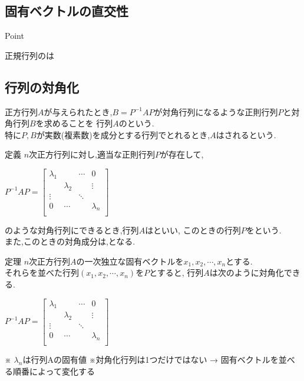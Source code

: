 \documentclass[a4paper]{jsarticle}
\begin{document}
\subsection{固有ベクトルの直交性}
\begin{itembox}[l]{Point}
    \begin{center}
        正規行列のは\\
    \end{center}
\end{itembox}

\subsection{行列の対角化}
正方行列$A$が与えられたとき,$B=P^{-1}AP$が対角行列になるような正則行列$P$と対角行列$B$を求めることを
行列$A$のという.\\
特に$P,B$が実数(複素数)を成分とする行列でとれるとき,$A$はされるという.
\begin{itembox}[l]{定義}
    $n$次正方行列に対し,適当な正則行列$P$が存在して,\\
    \begin{center}
        $P^{-1}AP=
            \begin{bmatrix}
                \lambda_1 &           & \cdots & 0         \\
                          & \lambda_2 &        & \vdots    \\
                \vdots    &           & \ddots &           \\
                0         & \cdots    &        & \lambda_n \\
            \end{bmatrix}
        $
    \end{center}
    のような対角行列にできるとき,行列$A$はといい,
    このときの行列$P$をという.\\
    また,このときの対角成分は,となる.
\end{itembox}
\begin{itembox}[l]{定理}
    $n$次正方行列$A$の一次独立な固有ベクトルを$x_1,x_2,\cdots,x_n$とする.\\
    それらを並べた行列$\left(x_1,x_2,\cdots,x_n\right)$を$P$とすると,
    行列$A$は次のように対角化できる.
    \begin{center}
        $P^{-1}AP=
            \begin{bmatrix}
                \lambda_1 &           & \cdots & 0         \\
                          & \lambda_2 &        & \vdots    \\
                \vdots    &           & \ddots &           \\
                0         & \cdots    &        & \lambda_n \\
            \end{bmatrix}
        $
    \end{center}
    ※ $\lambda_n$は行列Aの固有値
    ※対角化行列は1つだけではない → 固有ベクトルを並べる順番によって変化する
\end{itembox}
\end{document}
